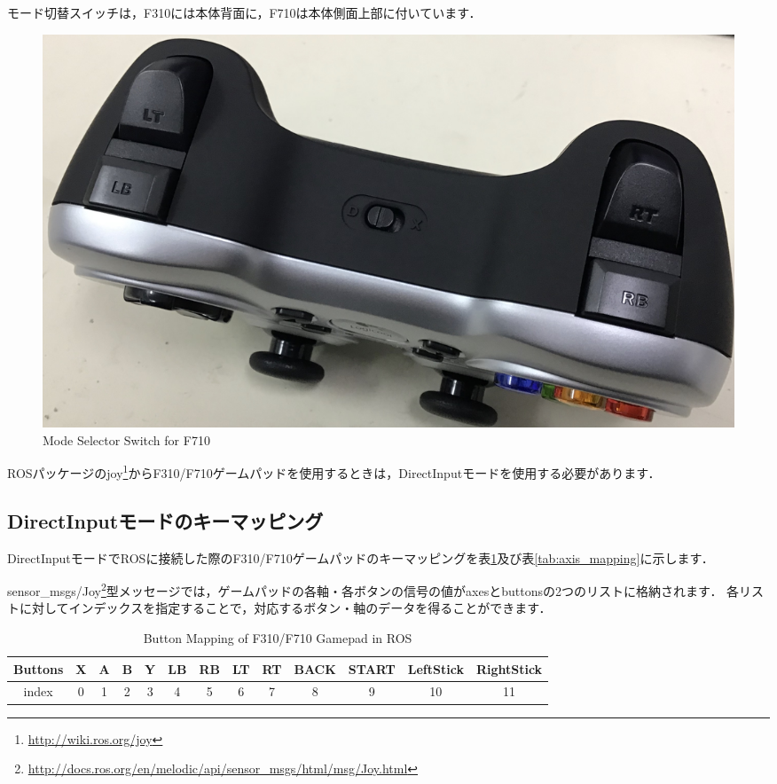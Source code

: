 \documentclass[{../../master}]{subfiles}
\begin{document}
  \noindent
  モード切替スイッチは，F310には本体背面に，F710は本体側面上部に付いています．

  \begin{figure}[ht]
    \centering
    \includegraphics[clip, width=65truemm]{images/mode_switch.jpg}
    \caption{Mode Selector Switch for F710}
    \label{fig:mode_switch}
  \end{figure}

  ROSパッケージの\textsf{joy}\footnote{\url{http://wiki.ros.org/joy}}からF310/F710ゲームパッドを使用するときは，\textsf{DirectInput}モードを使用する必要があります．

\subsection{\textsf{DirectInput}モードのキーマッピング}

\textsf{DirectInput}モードでROSに接続した際のF310/F710ゲームパッドのキーマッピングを表\ref{tab:buttom_mapping}及び表\ref{tab:axis_mapping}に示します．

\textsf{sensor\_msgs/Joy}\footnote{\url{http://docs.ros.org/en/melodic/api/sensor_msgs/html/msg/Joy.html}}型メッセージでは，ゲームパッドの各軸・各ボタンの信号の値が\textsf{axes}と\textsf{buttons}の2つのリストに格納されます．
各リストに対してインデックスを指定することで，対応するボタン・軸のデータを得ることができます．

\begin{table}[h]
  \begin{center}
    \begin{tabular}{|c|c|c|c|c|c|c|c|c|c|c|c|c|} \hline
      Buttons & X & A & B & Y & LB & RB & LT & RT & BACK & START & LeftStick & RightStick \\ \hline
       index  & 0 & 1 & 2 & 3 & 4  & 5  & 6  & 7  & 8    &   9   &   10      &     11     \\ \hline
    \end{tabular}
    \caption{Button Mapping of F310/F710 Gamepad in ROS}
    \label{tab:buttom_mapping}
  \end{center}
\end{table}
\end{document}
